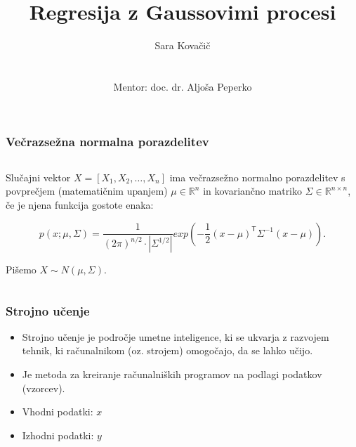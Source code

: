 \documentclass{beamer}
\title[] %
{Regresija z Gaussovimi procesi}
\author[S. Kovačič] %
{Sara Kovačič \\
\quad \\
\quad \\
Mentor: doc. dr. Aljoša Peperko 
}
\date[30. november 2018] %
\begin{document}
\begin{frame}
  \titlepage
\end{frame}







\begin{frame}
  \frametitle{Večrazsežna normalna porazdelitev}


\begin{columns}
\begin{column}{10cm}
Slučajni vektor  $ X = [X_{1}, X_{2}, \ldots, X_{n}] $  ima večrazsežno normalno porazdelitev s povprečjem (matematičnim upanjem) $ \mu \in \mathbb{R}^{n} $
 in kovariančno matriko $\Sigma \in \mathbb{R}^{n \times n} $, če je njena funkcija gostote enaka:

 
  $$ p(x; \mu , \Sigma) = \frac{1}{ (2 \pi)^{n/2}       \cdot     \left| \Sigma^{1/2} \right|    } 
   exp \left(  - \frac{1}{2} (x- \mu)^\mathsf{T} \Sigma^{-1}(x-\mu) \right).
  $$
 
Pišemo $ X \sim N(\mu, \Sigma) $. 


\end{column}
\end{columns}
\end{frame}


\begin{frame}\frametitle{Strojno učenje}
\begin{itemize}
\item Strojno učenje je področje umetne inteligence, ki se ukvarja z razvojem tehnik, ki računalnikom (oz. strojem) omogočajo, da se lahko učijo.
\item Je metoda za kreiranje računalniških programov na podlagi podatkov (vzorcev).
\item Vhodni podatki: $ x$
\item Izhodni podatki: $y$
\end{itemize}



\end{frame}
\end{document}

